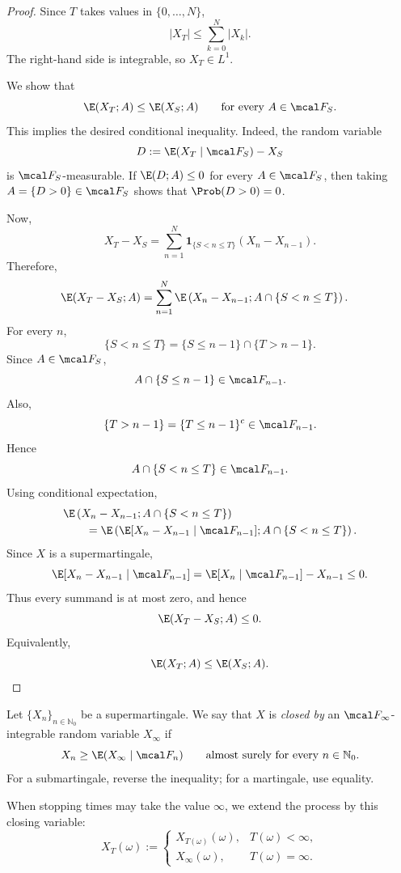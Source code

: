 \begin{proof}
Since $T$ takes values in $\{0,\ldots,N\}$,
\[
    |X_T|
    \leq \sum_{k=0}^N |X_k|.
\]
The right-hand side is integrable, so $X_T\in L^1$.

We show that
\[
    \E(X_T;A)\leq \E(X_S;A)
    \qquad\text{for every }A\in\mcal F_S.
\]
This implies the desired conditional inequality. Indeed, the random
variable
\[
    D:=\E(X_T\mid\mcal F_S)-X_S
\]
is $\mcal F_S$-measurable. If $\E(D;A)\leq 0$ for every
$A\in\mcal F_S$, then taking $A=\{D>0\}\in\mcal F_S$ shows that
$\Prob(D>0)=0$.

Now,
\[
    X_T-X_S
    =
    \sum_{n=1}^N
    \mathbf 1_{\{S<n\leq T\}}(X_n-X_{n-1}).
\]
Therefore,
\begin{align*}
    \E(X_T-X_S;A)
    &=
    \sum_{n=1}^N
    \E\left(
        X_n-X_{n-1};
        A\cap\{S<n\leq T\}
    \right).
\end{align*}
For every $n$,
\[
    \{S<n\leq T\}
    =
    \{S\leq n-1\}\cap\{T>n-1\}.
\]
Since $A\in\mcal F_S$,
\[
    A\cap\{S\leq n-1\}\in\mcal F_{n-1}.
\]
Also,
\[
    \{T>n-1\}
    =
    \{T\leq n-1\}^c
    \in\mcal F_{n-1}.
\]
Hence
\[
    A\cap\{S<n\leq T\}\in\mcal F_{n-1}.
\]
Using conditional expectation,
\begin{align*}
    &\E\left(
        X_n-X_{n-1};
        A\cap\{S<n\leq T\}
    \right) \\
    &\qquad =
    \E\left(
        \E[X_n-X_{n-1}\mid\mcal F_{n-1}];
        A\cap\{S<n\leq T\}
    \right).
\end{align*}
Since $X$ is a supermartingale,
\[
    \E[X_n-X_{n-1}\mid\mcal F_{n-1}]
    =
    \E[X_n\mid\mcal F_{n-1}]-X_{n-1}
    \leq 0.
\]
Thus every summand is at most zero, and hence
\[
    \E(X_T-X_S;A)\leq 0.
\]
Equivalently,
\[
    \E(X_T;A)\leq \E(X_S;A).
\]
\end{proof}

\begin{definition}
Let $\{X_n\}_{n\in\mathbb N_0}$ be a supermartingale. We say that $X$
is \emph{closed by} an $\mcal F_\infty$-integrable random variable
$X_\infty$ if
\[
    X_n\geq \E(X_\infty\mid\mcal F_n)
    \qquad\text{almost surely for every }n\in\mathbb N_0.
\]
For a submartingale, reverse the inequality; for a martingale, use
equality.

When stopping times may take the value $\infty$, we extend the process
by this closing variable:
\[
    X_T(\omega):=
    \begin{cases}
        X_{T(\omega)}(\omega), & T(\omega)<\infty,\\
        X_\infty(\omega), & T(\omega)=\infty.
    \end{cases}
\]
\end{definition}

